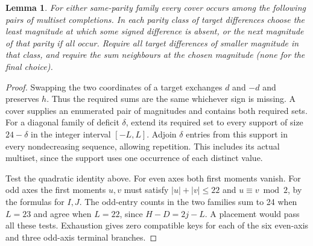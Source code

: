 \documentclass[11pt]{article}
\newtheorem{lemma}[theorem]{Lemma}
\begin{document}
\begin{lemma}\label{lem:pure-enum}
For either same-parity family every cover occurs among the following
pairs of multiset completions. In each parity class of target differences
choose the least magnitude at which some signed difference is absent,
or the next magnitude of that parity if all occur. Require all target
differences of smaller magnitude in that class, and require the sum
neighbours at the chosen magnitude (none for the final choice).
\end{lemma}
\begin{proof}
Swapping the two coordinates of a target exchanges $d$ and $-d$ and
preserves $h$. Thus the required sums are the same whichever sign is
missing. A cover supplies an enumerated pair of magnitudes and contains
both required sets. For a diagonal family of deficit $\delta$, extend
its required set to every support of size $24-\delta$ in the integer
interval $[-L,L]$. Adjoin $\delta$ entries from this support in every
nondecreasing sequence, allowing repetition. This includes its actual
multiset, since the support uses one occurrence of each distinct value.

Test the quadratic identity above. For even axes both first moments
vanish. For odd axes the first moments $u,v$ must satisfy
$|u|+|v|\le22$ and $u\equiv v\bmod2$, by the formulas for $I,J$.
The odd-entry counts in the two families sum to 24 when $L=23$ and
agree when $L=22$, since $H-D=2j-L$. A placement would pass all
these tests. Exhaustion gives zero compatible keys for each of the six
even-axis and three odd-axis terminal branches.
\end{proof}
\end{document}
